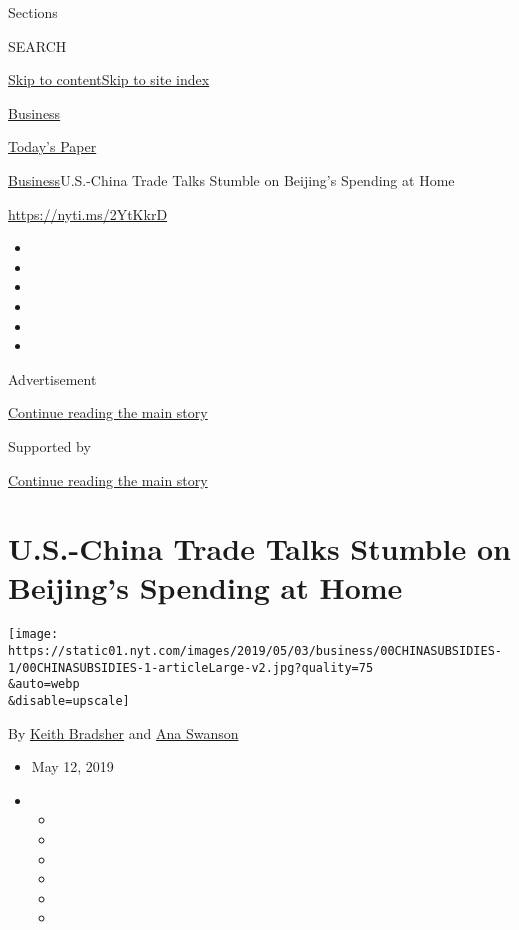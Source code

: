 Sections

SEARCH

\protect\hyperlink{site-content}{Skip to
content}\protect\hyperlink{site-index}{Skip to site index}

\href{https://www.nytimes.com/section/business}{Business}

\href{https://myaccount.nytimes.com/auth/login?response_type=cookie\&client_id=vi}{}

\href{https://www.nytimes.com/section/todayspaper}{Today's Paper}

\href{/section/business}{Business}\textbar{}U.S.-China Trade Talks
Stumble on Beijing's Spending at Home

\url{https://nyti.ms/2YtKkrD}

\begin{itemize}
\item
\item
\item
\item
\item
\item
\end{itemize}

Advertisement

\protect\hyperlink{after-top}{Continue reading the main story}

Supported by

\protect\hyperlink{after-sponsor}{Continue reading the main story}

\hypertarget{us-china-trade-talks-stumble-on-beijings-spending-at-home}{%
\section{U.S.-China Trade Talks Stumble on Beijing's Spending at
Home}\label{us-china-trade-talks-stumble-on-beijings-spending-at-home}}

\texttt{[image: https://static01.nyt.com/images/2019/05/03/business/00CHINASUBSIDIES-1/00CHINASUBSIDIES-1-articleLarge-v2.jpg?quality=75\\\&auto=webp\\\&disable=upscale]}

By \href{https://www.nytimes.com/by/keith-bradsher}{Keith Bradsher} and
\href{https://www.nytimes.com/by/ana-swanson}{Ana Swanson}

\begin{itemize}
\item
  May 12, 2019
\item
  \begin{itemize}
  \item
  \item
  \item
  \item
  \item
  \item
  \end{itemize}
\end{itemize}

